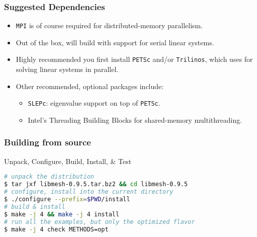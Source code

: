 \begin{frame}
  \frametitle{\libMesh{} Suggested Dependencies}
  \begin{itemize}
    \item  \texttt{MPI} is of course required for distributed-memory parallelism.
    \item Out of the box, \libMesh{} will build with support for serial linear systems.
    \item Highly recommended you first install \texttt{PETSc} and/or \texttt{Trilinos}, which \libMesh{} uses for solving linear systems in parallel.
      \item Other recommended, optional packages include:
        \begin{itemize}
          \item \texttt{SLEPc}: eigenvalue support on top of \texttt{PETSc}.
          \item Intel's Threading Building Blocks for shared-memory multithreading.
        \end{itemize}
  \end{itemize}
\end{frame}

\begin{frame}[fragile]
  \frametitle{Building \libMesh{} from source}

  \begin{block}{Unpack, Configure, Build, Install, \& Test}
    \begin{lstlisting}[language=bash]
# unpack the distribution
$ tar jxf libmesh-0.9.5.tar.bz2 && cd libmesh-0.9.5
# configure, install into the current directory
$ ./configure --prefix=$PWD/install
# build & install
$ make -j 4 && make -j 4 install
# run all the examples, but only the optimized flavor
$ make -j 4 check METHODS=opt
    \end{lstlisting}
  \end{block}
\end{frame}



